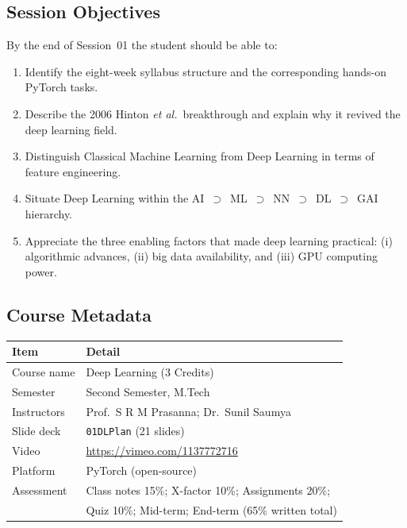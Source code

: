 \documentclass[12pt,a4paper]{article}
\begin{document}
\subsection{Session Objectives}
\label{subsec:objectives}

By the end of Session~01 the student should be able to:
\begin{enumerate}[label=\textbf{O\arabic*.}]
  \item Identify the eight-week syllabus structure and the corresponding
        hands-on PyTorch tasks.
  \item Describe the 2006 Hinton \emph{et al.}\ breakthrough and explain why
        it revived the deep learning field.
  \item Distinguish Classical Machine Learning from Deep Learning in terms
        of feature engineering.
  \item Situate Deep Learning within the AI~$\supset$~ML~$\supset$~NN~$\supset$~DL~$\supset$~GAI hierarchy.
  \item Appreciate the three enabling factors that made deep learning
        practical: (i) algorithmic advances, (ii) big data availability, and
        (iii) GPU computing power.
\end{enumerate}

\subsection{Course Metadata}
\label{subsec:metadata}

\begin{center}
\begin{tabular}{ll}
\toprule
\textbf{Item} & \textbf{Detail} \\
\midrule
Course name   & Deep Learning (3 Credits) \\
Semester      & Second Semester, M.Tech \\
Instructors   & Prof.\ S R M Prasanna; Dr.\ Sunil Saumya \\
Slide deck    & \texttt{01DLPlan} (21 slides) \\
Video         & \url{https://vimeo.com/1137772716} \\
Platform      & PyTorch (open-source) \\
Assessment    & Class notes 15\%; X-factor 10\%; Assignments 20\%;\\
              & Quiz 10\%; Mid-term; End-term (65\% written total) \\
\bottomrule
\end{tabular}
\end{center}
\end{document}

